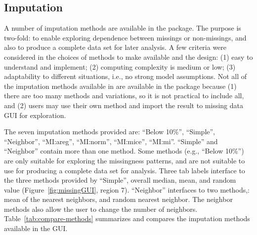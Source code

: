 \documentclass[article]{jss}
\begin{document}
\subsection{Imputation}\label{imputation}

A number of imputation methods are available in the package.
The purpose is two-fold: to enable exploring dependence between
missings or non-missings, and also to produce a complete data
set for later analysis. A few criteria were considered in the
choices of methods to make available and the design: (1) easy
to understand and implement; (2) computing complexity is medium
or low; (3) adaptability to different situations, i.e., no strong
model assumptions. Not all of the imputation methods available
in  are available in the package because (1) there
are too many methods and variations, so it is not practical to
include all, and (2) users may use their own method and import
the result to missing data GUI for exploration.

The seven imputation methods provided are: ``Below 10\%'',
``Simple'', ``Neighbor'', ``MI:areg'', ``MI:norm'', ``MI:mice'', ``MI:mi''. 
``Simple'' and ``Neighbor'' contain more than one method.
Some methods (e.g., ``Below 10\%'') are only suitable for
exploring the missingness patterns, and are not suitable
to use for producing a complete data set for analysis. Three
tab labels interface to the three methods provided by ``Simple'',
overall median, mean, and random value (Figure~\ref{fig:missingGUI},
region 7). ``Neighbor'' interfaces to two methods,: mean of
the nearest neighbors, and random nearest neighbor. The neighbor
methods also allow the user to change the number of neighbors.
Table~\ref{tab:compare-methods} summarizes and compares the
imputation methods available in the GUI.
\end{document}
